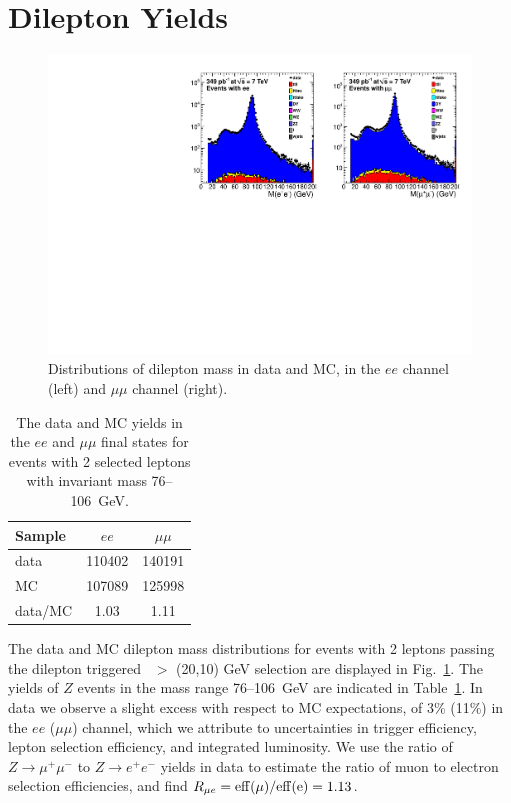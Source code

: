 \section{Dilepton Yields}

\begin{figure}[tbh]
\begin{center}
\includegraphics[width=1.0\linewidth]{plots/dilmass_349pb.pdf}
\caption{\label{fig:Z}\protect Distributions of dilepton mass in data and MC,
in the $ee$ channel (left) and $\mu\mu$ channel (right). 
}
\end{center}
\end{figure}


\begin{table}[htb]
\begin{center}
\caption{\label{tab:lepyields}
The data and MC yields in the $ee$ and $\mu\mu$ final states for events with 2 selected
leptons with invariant mass 76--106~GeV.
}
\begin{tabular}{l|cc}
\hline
         Sample   &           $ee$   &       $\mu\mu$   \\
\hline
data              &         110402   &         140191   \\
MC                &         107089   &         125998   \\
\hline
data/MC           &           1.03   &           1.11   \\
\hline
\end{tabular}
\end{center}
\end{table}

The data and MC dilepton mass distributions for events with 2 leptons passing the dilepton triggered 
\pt\ $>$ (20,10) GeV selection are displayed in Fig.~\ref{fig:Z}.
The yields of $Z$ events in the mass range 76--106~GeV are indicated in Table~\ref{tab:lepyields}. 
In data we observe a slight excess with respect to MC expectations, of 3\% (11\%) in the $ee$ ($\mu\mu$) channel,
which we attribute to uncertainties in trigger efficiency, lepton selection efficiency, and integrated
luminosity. We use the ratio of $Z \to \mu^+\mu^-$ to $Z \to e^+e^-$ yields in data to estimate the
ratio of muon to electron selection efficiencies, and find $R_{\mu e} = \rm{eff}(\mu)/\rm{eff}(e) = 1.13$.

